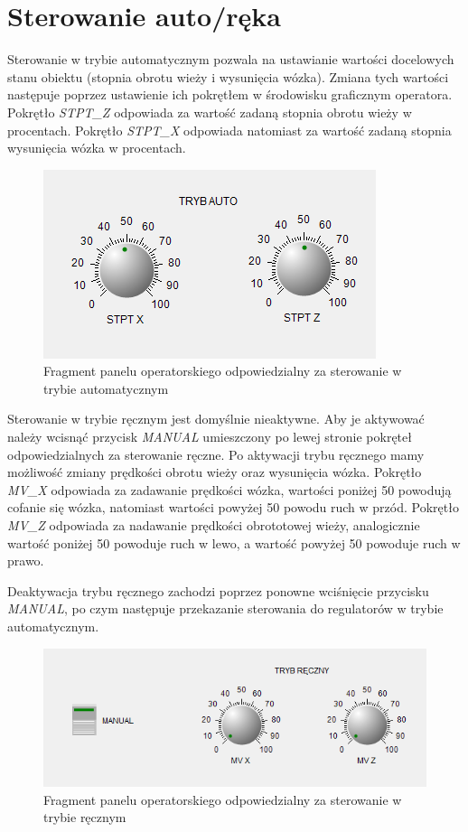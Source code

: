 \documentclass{mwrep}
\begin{document}
\section{Sterowanie auto/ręka}
\label{MAPS::AutoReka}

Sterowanie w trybie automatycznym pozwala na ustawianie wartości docelowych stanu obiektu (stopnia obrotu wieży i wysunięcia wózka). Zmiana tych wartości następuje poprzez ustawienie ich pokrętłem w środowisku graficznym operatora.
Pokrętło \emph{STPT\_Z} odpowiada za wartość zadaną stopnia obrotu wieży w procentach. Pokrętło \emph{STPT\_X} odpowiada natomiast za wartość zadaną stopnia wysunięcia wózka w procentach.

\begin{figure}[H]
    \label{MAPS::PanelOperatorski}
    \centering
    \includegraphics[scale=0.8]{auto.png}
    \caption{Fragment panelu operatorskiego odpowiedzialny za sterowanie w trybie automatycznym}
\end{figure}

Sterowanie w trybie ręcznym jest domyślnie nieaktywne. Aby je aktywować należy wcisnąć przycisk \emph{MANUAL} umieszczony po lewej stronie pokręteł odpowiedzialnych za sterowanie ręczne. Po aktywacji trybu ręcznego mamy możliwość zmiany prędkości obrotu wieży oraz wysunięcia wózka. Pokrętło \emph{MV\_X} odpowiada za zadawanie prędkości wózka, wartości poniżej 50 powodują cofanie się wózka, natomiast wartości powyżej 50 powodu ruch w przód. Pokrętło \emph{MV\_Z} odpowiada za nadawanie prędkości obrototowej wieży, analogicznie wartość poniżej 50 powoduje ruch w lewo, a wartość powyżej 50 powoduje ruch w prawo.

Deaktywacja trybu ręcznego zachodzi poprzez ponowne wciśnięcie przycisku \emph{MANUAL}, po czym następuje przekazanie sterowania do regulatorów w trybie automatycznym.

\begin{figure}[H]
    \label{MAPS::PanelOperatorski}
    \centering
    \includegraphics[scale=0.8]{reka.png}
    \caption{Fragment panelu operatorskiego odpowiedzialny za sterowanie w trybie ręcznym}
\end{figure}
\end{document}
